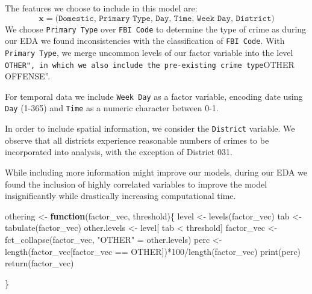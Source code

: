 \documentclass[
]{article}
\newenvironment{Shaded}{\begin{snugshade}}{\end{snugshade}}
\newcommand{\ControlFlowTok}[1]{\textcolor[rgb]{0.13,0.29,0.53}{\textbf{#1}}}
\newcommand{\DecValTok}[1]{\textcolor[rgb]{0.00,0.00,0.81}{#1}}
\newcommand{\FunctionTok}[1]{\textcolor[rgb]{0.00,0.00,0.00}{#1}}
\newcommand{\NormalTok}[1]{#1}
\newcommand{\OtherTok}[1]{\textcolor[rgb]{0.56,0.35,0.01}{#1}}
\newcommand{\SpecialCharTok}[1]{\textcolor[rgb]{0.00,0.00,0.00}{#1}}
\newcommand{\StringTok}[1]{\textcolor[rgb]{0.31,0.60,0.02}{#1}}
\begin{document}
The features we choose to include in this model are:
\[\mathbf{x} = \texttt{(Domestic, Primary Type, Day, Time, Week Day, District})\]
We choose \texttt{Primary Type} over \texttt{FBI Code} to determine the
type of crime as during our EDA we found inconsistencies with the
classification of \texttt{FBI Code}. With \texttt{Primary Type}, we
merge uncommon levels of our factor variable into the level
\texttt{OTHER",\ in\ which\ we\ also\ include\ the\ pre-existing\ crime\ type}OTHER
OFFENSE''.

For temporal data we include \texttt{Week Day} as a factor variable,
encoding date using \texttt{Day} (1-365) and \texttt{Time} as a numeric
character between 0-1.

In order to include spatial information, we consider the
\texttt{District} variable. We observe that all districts experience
reasonable numbers of crimes to be incorporated into analysis, with the
exception of District 031.

While including more information might improve our models, during our
EDA we found the inclusion of highly correlated variables to improve the
model insignificantly while drastically increasing computational time.

\begin{Shaded}
\begin{Highlighting}[]
\NormalTok{othering }\OtherTok{\textless{}{-}} \ControlFlowTok{function}\NormalTok{(factor\_vec, threshold)\{}
\NormalTok{  level }\OtherTok{\textless{}{-}} \FunctionTok{levels}\NormalTok{(factor\_vec) }
\NormalTok{  tab }\OtherTok{\textless{}{-}} \FunctionTok{tabulate}\NormalTok{(factor\_vec)}
\NormalTok{  other.levels }\OtherTok{\textless{}{-}}\NormalTok{ level[ tab }\SpecialCharTok{\textless{}}\NormalTok{ threshold]}
\NormalTok{  factor\_vec }\OtherTok{\textless{}{-}} \FunctionTok{fct\_collapse}\NormalTok{(factor\_vec, }\StringTok{"OTHER"} \OtherTok{=}\NormalTok{ other.levels)}
\NormalTok{  perc }\OtherTok{\textless{}{-}} \FunctionTok{length}\NormalTok{(factor\_vec[factor\_vec }\SpecialCharTok{==} \StringTok{\textquotesingle{}OTHER\textquotesingle{}}\NormalTok{])}\SpecialCharTok{*}\DecValTok{100}\SpecialCharTok{/}\FunctionTok{length}\NormalTok{(factor\_vec)}
  \FunctionTok{print}\NormalTok{(perc)}
  \FunctionTok{return}\NormalTok{(factor\_vec)}
  
\NormalTok{\}}
\end{Highlighting}
\end{Shaded}
\end{document}
